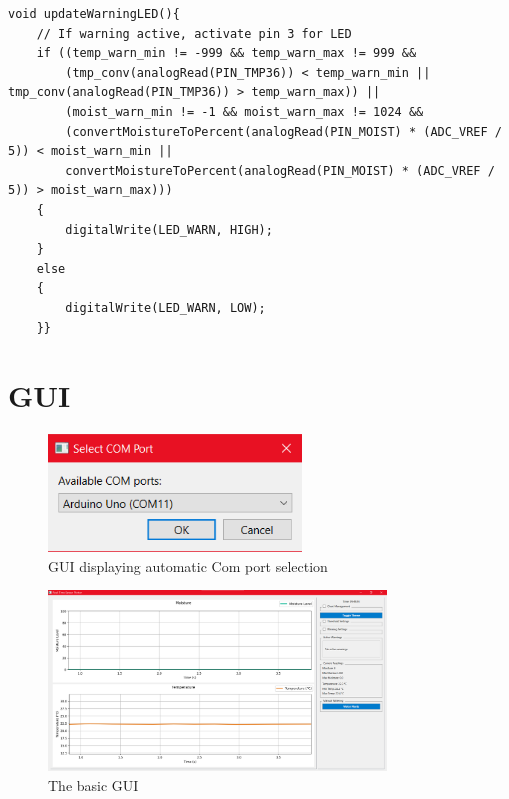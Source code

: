 \documentclass[a4paper,11pt]{article}
\begin{document}
\begin{lstlisting}[style=cpp-style, 
caption={LED warning light}, label={prog:LED}]
void updateWarningLED(){
    // If warning active, activate pin 3 for LED
    if ((temp_warn_min != -999 && temp_warn_max != 999 &&
        (tmp_conv(analogRead(PIN_TMP36)) < temp_warn_min || tmp_conv(analogRead(PIN_TMP36)) > temp_warn_max)) ||
        (moist_warn_min != -1 && moist_warn_max != 1024 &&
        (convertMoistureToPercent(analogRead(PIN_MOIST) * (ADC_VREF / 5)) < moist_warn_min ||
        convertMoistureToPercent(analogRead(PIN_MOIST) * (ADC_VREF / 5)) > moist_warn_max)))
    {
        digitalWrite(LED_WARN, HIGH);
    }
    else
    {
        digitalWrite(LED_WARN, LOW);
    }}
\end{lstlisting}

\section{GUI}

\begin{figure}[H]
    \centering
    \includegraphics[width=0.6\textwidth]{1 - Select Comm Port.png}
    \caption{GUI displaying automatic Com port selection}
    \label{fig:port}
\end{figure}

\begin{figure}[H]
    \centering
    \includegraphics[width=0.8\textwidth]{2 - Blank Chart.png}
    \caption{The basic GUI}
    \label{fig:blank_gui}
\end{figure}
\end{document}
